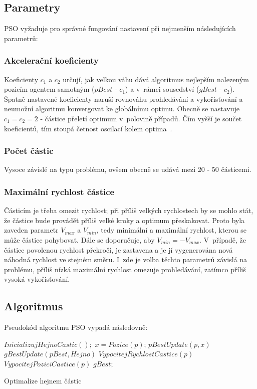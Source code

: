 \subsection{Parametry}
PSO vyžaduje pro správné fungování nastavení při nejmenším následujících parametrů:

\subsubsection{Akcelerační koeficienty}
Koeficienty $c_1$ a $c_2$ určují, jak velkou váhu dává algoritmus nejlepším nalezeným pozicím agentem samotným ($pBest$ - $c_1$) a v~rámci sousedství ($gBest$ - $c_2$). Špatně nastavené koeficienty naruší rovnováhu prohledávání a vykořisťování a neumožní algoritmu konvergovat ke globálnímu optimu. Obecně se nastavuje $c_1 = c_2 = 2$ - částice přeletí optimum v~polovině případů. Čím vyšší je součet koeficientů, tím stoupá četnost oscilací kolem optima~\cite{pso_article}.

\subsubsection{Počet částic}
Vysoce závislé na typu problému, ovšem obecně se udává mezi 20 - 50 částicemi.

\subsubsection{Maximální rychlost částice}
Částicím je třeba omezit rychlost; při příliš velkých rychlostech by se mohlo stát, že částice bude provádět příliš velké kroky a optimum přeskakovat. Proto byla zaveden parametr $V_{max}$ a $V_{min}$, tedy minimální a maximální rychlost, kterou se může částice pohybovat. Dále se doporučuje, aby $V_{min} = - V_{max}$. V~případě, že částice povolenou rychlost překročí, je zastavena a je jí vygenerována nová náhodná rychlost ve stejném směru. I~zde je volba těchto parametrů závislá na problému, příliš nízká maximální rychlost omezuje prohledávání, zatímco příliš vysoká vykořisťování.



\subsection{Algoritmus}
Pseudokód algoritmu PSO vypadá následovně:

\begin{algorithm}[H]
\begin{algorithmic}
\State $InicializujHejnoCastic();$
    \State $x = Pozice(p)$;
 	    \State $pBestUpdate(p, x)$
 	\EndIf
\EndFor
\State $gBestUpdate(pBest, Hejno)$
     \State $VypocitejRychlostCastice(p)$
     \State $VypocitejPoziciCastice(p)$
\EndFor
\EndWhile
\State \Return $gBest;$
\end{algorithmic}
\caption{Optimalize hejnem částic}
\label{code:tabu}
\end{algorithm}

